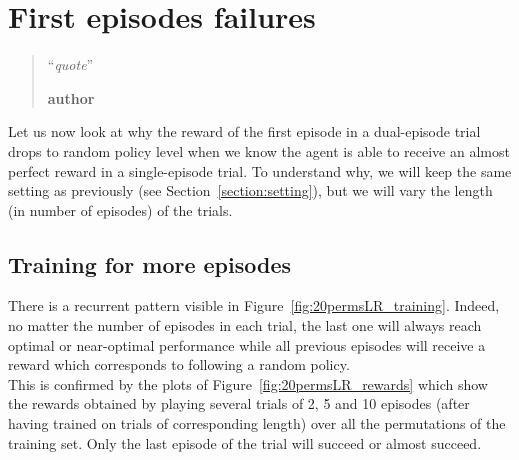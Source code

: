 \chapter{First episodes failures}
\label{chap:reward_structure}
\begin{quotation}
\noindent ``\emph{quote}''
\begin{flushright}\textbf{author}\end{flushright}
\end{quotation}

Let us now look at why the reward of the first episode in a dual-episode
trial drops to random policy level when we know the agent is able to receive
an almost perfect reward in a single-episode trial. To understand why, we will
keep the same setting as previously (see Section~\ref{section:setting}), but
we will vary the length (in number of episodes) of the trials.

\section{Training for more episodes}
There is a recurrent pattern visible in Figure~\ref{fig:20permsLR_training}.
Indeed, no matter the number of episodes in each trial, the last one will
always reach optimal or near-optimal performance while all previous episodes
will receive a reward which corresponds to following a random policy.\\

This is confirmed by the plots of Figure~\ref{fig:20permsLR_rewards} which
show the rewards obtained by playing several trials of 2, 5 and 10 episodes
(after having trained on trials of corresponding length) over all the
permutations of the training set. Only the last episode of the trial will
succeed or almost succeed.

